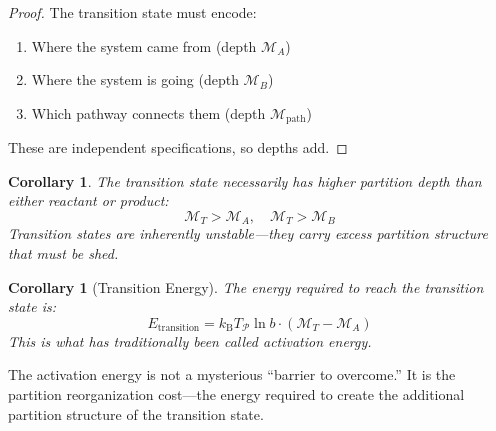\documentclass[twocolumn,10pt,a4paper]{article}
\newtheorem{corollary}[theorem]{Corollary}
\theoremstyle{definition}
\theoremstyle{remark}
\newcommand{\kB}{k_{\mathrm{B}}}
\newcommand{\Depth}{\mathcal{M}}
\newcommand{\Part}{\mathcal{P}}
\begin{document}
\begin{proof}
The transition state must encode:
\begin{enumerate}
    \item Where the system came from (depth $\Depth_A$)
    \item Where the system is going (depth $\Depth_B$)
    \item Which pathway connects them (depth $\Depth_{\mathrm{path}}$)
\end{enumerate}
These are independent specifications, so depths add.
\end{proof}

\begin{corollary}
The transition state necessarily has higher partition depth than either reactant or product:
\begin{equation}
    \Depth_T > \Depth_A, \quad \Depth_T > \Depth_B
\end{equation}
Transition states are inherently unstable---they carry excess partition structure that must be shed.
\end{corollary}

\begin{corollary}[Transition Energy]
\label{cor:activation}
The energy required to reach the transition state is:
\begin{equation}
    E_{\mathrm{transition}} = \kB T_{\Part} \ln b \cdot (\Depth_T - \Depth_A)
\end{equation}
This is what has traditionally been called activation energy.
\end{corollary}

The activation energy is not a mysterious ``barrier to overcome.'' It is the partition reorganization cost---the energy required to create the additional partition structure of the transition state.
\end{document}
